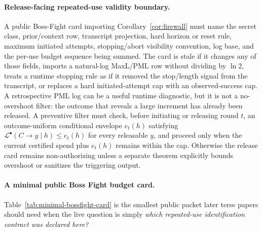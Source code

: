 \documentclass[11pt]{article}
\newcommand{\PML}{\mathcal{L}^{\bullet}}
\begin{document}
\paragraph{Release-facing repeated-use validity boundary.}
A public Boss-Fight card importing Corollary~\ref{cor:firewall} must name the secret class, prior/context row, transcript projection, hard horizon or reset rule, maximum initiated attempts, stopping/abort visibility convention, log base, and the per-use budget sequence being summed.
The card is stale if it changes any of those fields, imports a natural-log MaxL/PML row without dividing by $\ln 2$, treats a runtime stopping rule as if it removed the stop/length signal from the transcript, or replaces a hard initiated-attempt cap with an observed-success cap.
A retrospective PML log can be a useful runtime diagnostic, but it is not a no-overshoot filter: the outcome that reveals a large increment has already been released. A preventive filter must check, before initiating or releasing round $t$, an outcome-uniform conditional envelope $e_t(h)$ satisfying $\PML(C\!\to\!y\mid h)\le e_t(h)$ for every releasable $y$, and proceed only when the current certified spend plus $e_t(h)$ remains within the cap. Otherwise the release card remains non-authorizing unless a separate theorem explicitly bounds overshoot or sanitizes the triggering output.

\paragraph{A minimal public Boss Fight budget card.}
Table~\ref{tab:minimal-bossfight-card} is the smallest public packet later terse papers should need when the live question is simply \emph{which repeated-use identification contract was declared here?}
\end{document}
